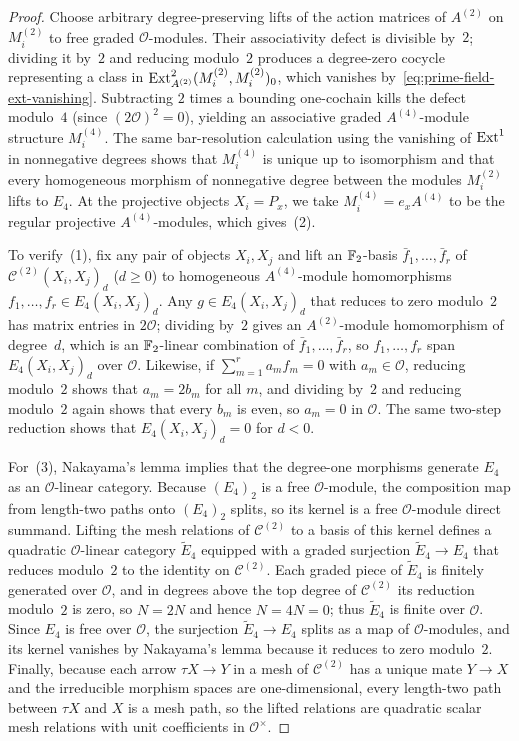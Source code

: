 \begin{proof}
Choose arbitrary degree-preserving lifts of the action matrices of $A^{(2)}$ on $M_i^{(2)}$ to free graded $\mathcal O$-modules. Their associativity defect is divisible by~$2$; dividing it by~$2$ and reducing modulo~$2$ produces a degree-zero cocycle representing a class in $\operatorname{Ext}^2_{A^{(2)}}(M_i^{(2)},M_i^{(2)})_0$, which vanishes by~\eqref{eq:prime-field-ext-vanishing}. Subtracting $2$ times a bounding one-cochain kills the defect modulo~$4$ (since $(2\mathcal O)^2=0$), yielding an associative graded $A^{(4)}$-module structure $M_i^{(4)}$. The same bar-resolution calculation using the vanishing of $\operatorname{Ext}^1$ in nonnegative degrees shows that $M_i^{(4)}$ is unique up to isomorphism and that every homogeneous morphism of nonnegative degree between the modules $M_i^{(2)}$ lifts to $E_4$. At the projective objects $X_i=P_x$, we take $M_i^{(4)}=e_xA^{(4)}$ to be the regular projective $A^{(4)}$-modules, which gives~(2).

To verify~(1), fix any pair of objects $X_i,X_j$ and lift an $\mathbb F_2$-basis $\bar f_1,\ldots,\bar f_r$ of $\mathcal C^{(2)}(X_i,X_j)_d$ ($d\geq0$) to homogeneous $A^{(4)}$-module homomorphisms $f_1,\ldots,f_r\in E_4(X_i,X_j)_d$. Any $g\in E_4(X_i,X_j)_d$ that reduces to zero modulo~$2$ has matrix entries in $2\mathcal O$; dividing by~$2$ gives an $A^{(2)}$-module homomorphism of degree~$d$, which is an $\mathbb F_2$-linear combination of $\bar f_1,\ldots,\bar f_r$, so $f_1,\ldots,f_r$ span $E_4(X_i,X_j)_d$ over $\mathcal O$. Likewise, if $\sum_{m=1}^r a_mf_m=0$ with $a_m\in\mathcal O$, reducing modulo~$2$ shows that $a_m=2b_m$ for all $m$, and dividing by~$2$ and reducing modulo~$2$ again shows that every $b_m$ is even, so $a_m=0$ in $\mathcal O$. The same two-step reduction shows that $E_4(X_i,X_j)_d=0$ for $d<0$.

For~(3), Nakayama's lemma implies that the degree-one morphisms generate $E_4$ as an $\mathcal O$-linear category. Because $(E_4)_2$ is a free $\mathcal O$-module, the composition map from length-two paths onto $(E_4)_2$ splits, so its kernel is a free $\mathcal O$-module direct summand. Lifting the mesh relations of $\mathcal C^{(2)}$ to a basis of this kernel defines a quadratic $\mathcal O$-linear category $\widetilde E_4$ equipped with a graded surjection $\widetilde E_4\to E_4$ that reduces modulo~$2$ to the identity on $\mathcal C^{(2)}$. Each graded piece of $\widetilde E_4$ is finitely generated over $\mathcal O$, and in degrees above the top degree of $\mathcal C^{(2)}$ its reduction modulo~$2$ is zero, so $N=2N$ and hence $N=4N=0$; thus $\widetilde E_4$ is finite over $\mathcal O$. Since $E_4$ is free over $\mathcal O$, the surjection $\widetilde E_4\to E_4$ splits as a map of $\mathcal O$-modules, and its kernel vanishes by Nakayama's lemma because it reduces to zero modulo~$2$. Finally, because each arrow $\tau X\to Y$ in a mesh of $\mathcal C^{(2)}$ has a unique mate $Y\to X$ and the irreducible morphism spaces are one-dimensional, every length-two path between $\tau X$ and $X$ is a mesh path, so the lifted relations are quadratic scalar mesh relations with unit coefficients in $\mathcal O^\times$.
\end{proof}

